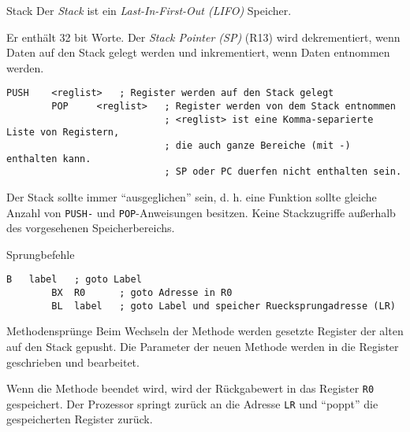 \begin{defi}{Stack}
    Der \emph{Stack} ist ein \emph{Last-In-First-Out (LIFO)} Speicher.

    Er enthält 32 bit Worte.
    Der \emph{Stack Pointer (SP)} (R13) wird dekrementiert, wenn Daten auf den Stack gelegt werden und inkrementiert, wenn Daten entnommen werden.

    \begin{lstlisting}[language={[x86masm]Assembler}]
        PUSH    <reglist>   ; Register werden auf den Stack gelegt
        POP     <reglist>   ; Register werden von dem Stack entnommen
                            ; <reglist> ist eine Komma-separierte Liste von Registern,
                            ; die auch ganze Bereiche (mit -) enthalten kann.
                            ; SP oder PC duerfen nicht enthalten sein.
    \end{lstlisting}

    Der Stack sollte immer \enquote{ausgeglichen} sein, d. h. eine Funktion sollte gleiche Anzahl von \texttt{PUSH-} und \texttt{POP}-Anweisungen besitzen.
    Keine Stackzugriffe außerhalb des vorgesehenen Speicherbereichs.
\end{defi}

\begin{defi}{Sprungbefehle}
    \begin{lstlisting}[language={[x86masm]Assembler}]
        B   label   ; goto Label
        BX  R0      ; goto Adresse in R0
        BL  label   ; goto Label und speicher Ruecksprungadresse (LR)
    \end{lstlisting}
\end{defi}

\begin{bonus}{Methodensprünge}
    Beim Wechseln der Methode werden gesetzte Register der alten auf den Stack gepusht.
    Die Parameter der neuen Methode werden in die Register geschrieben und bearbeitet.

    Wenn die Methode beendet wird, wird der Rückgabewert in das Register \texttt{R0} gespeichert.
    Der Prozessor springt zurück an die Adresse \texttt{LR} und \enquote{poppt} die gespeicherten Register zurück.
\end{bonus}

